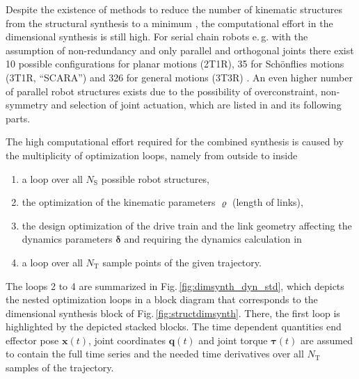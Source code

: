 \documentclass{svproc}
\newcommand{\bm}[1]{\boldsymbol{#1}}
\begin{document}

Despite the existence of methods to reduce the number of kinematic structures from the structural synthesis to a minimum \cite{RamirezKotOrt2015}, the computational effort in the dimensional synthesis is still high.
For serial chain robots e.\,g. with the assumption of non-redundancy and only parallel and orthogonal joints there exist 10 possible configurations for planar motions (2T1R), 35 for Schönflies motions (3T1R, ``SCARA'') and 326 for general motions (3T3R) \cite{RamirezKotOrt2015,RamirezKotOrt2017}.
An even higher number of parallel robot structures exists due to the possibility of overconstraint, non-symmetry and selection of joint actuation, which are listed in \cite{Gogu2008} and its following parts.

The high computational effort required for the combined synthesis is caused by the multiplicity of optimization loops, namely from outside to inside
\begin{enumerate}
\item a loop over all $N_{\mathrm{S}}$ possible robot structures,
\item the optimization of the kinematic parameters $\bm{\varrho}$ (length of links),
\item the design optimization of the drive train and the link geometry affecting the dynamics parameters $\bm{\delta}$ and requiring the dynamics calculation in 
\item a loop over all $N_\mathrm{T}$ sample points of the given trajectory.
\end{enumerate}

The loops 2 to 4 are summarized in Fig.\,\ref{fig:dimsynth_dyn_std}, which depicts the nested optimization loops in a block diagram that corresponds to the dimensional synthesis block of Fig.\,\ref{fig:structdimsynth}.
There, the first loop is highlighted by the depicted stacked blocks.
The time dependent quantities end effector pose $\bm{x}(t)$, joint coordinates $\bm{q}(t)$ and joint torque $\bm{\tau}(t)$ are assumed to contain the full time series and the needed time derivatives over all $N_\mathrm{T}$ samples of the trajectory.
\end{document}
